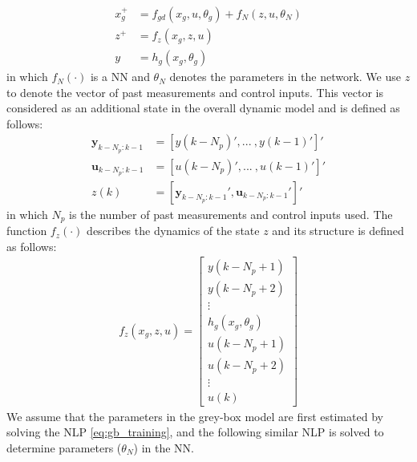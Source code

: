 \documentclass[10pt]{article}
\begin{document}
\begin{align*}
  x_g^+ &= f_{gd}(x_g, u, \theta_g) + f_N(z, u, \theta_N) \\
  z^+ &= f_z(x_g, z, u) \\
  y &= h_g(x_g, \theta_g)
\end{align*}
in which $f_N(\cdot)$ is a NN and $\theta_N$ denotes the parameters in the network. We use $z$ to denote the vector of past measurements and control inputs. This vector is considered as an additional state in the overall dynamic model and is defined as follows:
\begin{align} \label{eq:pastyu}
  \mathbf{y}_{k-N_p:k-1} &= [y(k-N_p)', ... \ , y(k-1)']' \nonumber \\
  \mathbf{u}_{k-N_p:k-1} &= [u(k-N_p)', ... \ , u(k-1)']' \nonumber \\
  z(k) &= [\mathbf{y}_{k-N_p:k-1}', \mathbf{u}_{k-N_p:k-1}']'
\end{align}
in which $N_p$ is the number of past measurements and control inputs used. The function $f_z(\cdot)$ describes the dynamics of the state $z$ and its structure is defined as follows: 
\begin{align*}
  f_z(x_g, z, u) = \begin{bmatrix}
    y(k-N_p+1) \\
    y(k-N_p+2) \\
    \vdots \\
    h_g(x_g, \theta_g) \\
    u(k-N_p+1) \\ 
    u(k-N_p+2) \\
    \vdots \\
    u(k)
  \end{bmatrix}
\end{align*}
We assume that the parameters in the grey-box model are first estimated by solving the NLP \eqref{eq:gb_training}, and the following similar NLP is solved to determine parameters ($\theta_N$) in the NN.
\end{document}
